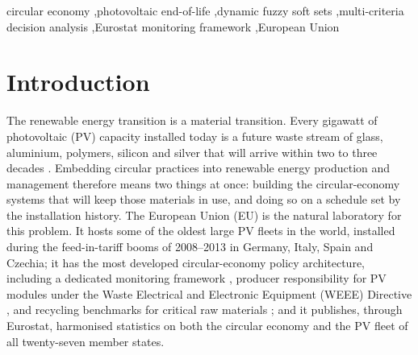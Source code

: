 \documentclass[a4paper,fleqn]{cas-sc}
\begin{document}
\begin{keywords}
circular economy \sep photovoltaic end-of-life \sep dynamic fuzzy soft sets \sep multi-criteria decision analysis \sep Eurostat monitoring framework \sep European Union
\end{keywords}

\maketitle

\section{Introduction}\label{sec:intro}

The renewable energy transition is a material transition. Every gigawatt of photovoltaic (PV) capacity installed today is a future waste stream of glass, aluminium, polymers, silicon and silver that will arrive within two to three decades \citep{irena2016,deng2019}. Embedding circular practices into renewable energy production and management therefore means two things at once: building the circular-economy systems that will keep those materials in use, and doing so on a schedule set by the installation history. The European Union (EU) is the natural laboratory for this problem. It hosts some of the oldest large PV fleets in the world, installed during the feed-in-tariff booms of 2008--2013 in Germany, Italy, Spain and Czechia; it has the most developed circular-economy policy architecture, including a dedicated monitoring framework \citep{ec2018framework,ec2023framework}, producer responsibility for PV modules under the Waste Electrical and Electronic Equipment (WEEE) Directive \citep{weee2012}, and recycling benchmarks for critical raw materials \citep{crma2024}; and it publishes, through Eurostat, harmonised statistics on both the circular economy and the PV fleet of all twenty-seven member states.
\end{document}
